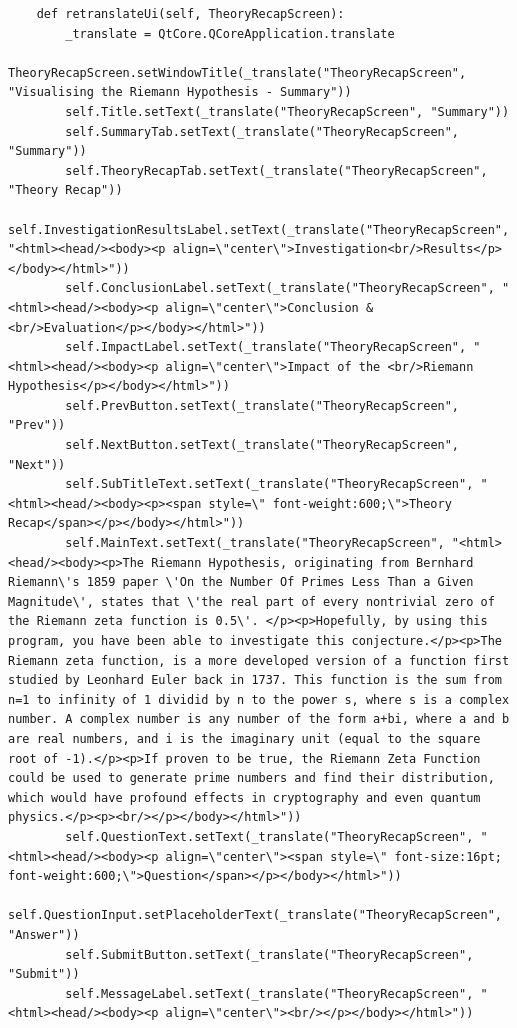 \documentclass{article}
\begin{document}
\begin{lstlisting}
    def retranslateUi(self, TheoryRecapScreen):
        _translate = QtCore.QCoreApplication.translate
        TheoryRecapScreen.setWindowTitle(_translate("TheoryRecapScreen", "Visualising the Riemann Hypothesis - Summary"))
        self.Title.setText(_translate("TheoryRecapScreen", "Summary"))
        self.SummaryTab.setText(_translate("TheoryRecapScreen", "Summary"))
        self.TheoryRecapTab.setText(_translate("TheoryRecapScreen", "Theory Recap"))
        self.InvestigationResultsLabel.setText(_translate("TheoryRecapScreen", "<html><head/><body><p align=\"center\">Investigation<br/>Results</p></body></html>"))
        self.ConclusionLabel.setText(_translate("TheoryRecapScreen", "<html><head/><body><p align=\"center\">Conclusion & <br/>Evaluation</p></body></html>"))
        self.ImpactLabel.setText(_translate("TheoryRecapScreen", "<html><head/><body><p align=\"center\">Impact of the <br/>Riemann Hypothesis</p></body></html>"))
        self.PrevButton.setText(_translate("TheoryRecapScreen", "Prev"))
        self.NextButton.setText(_translate("TheoryRecapScreen", "Next"))
        self.SubTitleText.setText(_translate("TheoryRecapScreen", "<html><head/><body><p><span style=\" font-weight:600;\">Theory Recap</span></p></body></html>"))
        self.MainText.setText(_translate("TheoryRecapScreen", "<html><head/><body><p>The Riemann Hypothesis, originating from Bernhard Riemann\'s 1859 paper \'On the Number Of Primes Less Than a Given Magnitude\', states that \'the real part of every nontrivial zero of the Riemann zeta function is 0.5\'. </p><p>Hopefully, by using this program, you have been able to investigate this conjecture.</p><p>The Riemann zeta function, is a more developed version of a function first studied by Leonhard Euler back in 1737. This function is the sum from n=1 to infinity of 1 dividid by n to the power s, where s is a complex number. A complex number is any number of the form a+bi, where a and b are real numbers, and i is the imaginary unit (equal to the square root of -1).</p><p>If proven to be true, the Riemann Zeta Function could be used to generate prime numbers and find their distribution, which would have profound effects in cryptography and even quantum physics.</p><p><br/></p></body></html>"))
        self.QuestionText.setText(_translate("TheoryRecapScreen", "<html><head/><body><p align=\"center\"><span style=\" font-size:16pt; font-weight:600;\">Question</span></p></body></html>"))
        self.QuestionInput.setPlaceholderText(_translate("TheoryRecapScreen", "Answer"))
        self.SubmitButton.setText(_translate("TheoryRecapScreen", "Submit"))
        self.MessageLabel.setText(_translate("TheoryRecapScreen", "<html><head/><body><p align=\"center\"><br/></p></body></html>"))
\end{lstlisting}
\end{document}
